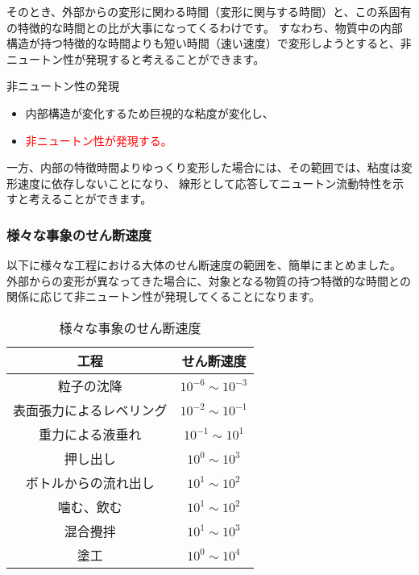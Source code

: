\documentclass[uplatex,dvipdfmx,a4paper,11pt]{jsarticle}
\begin{document}
そのとき、外部からの変形に関わる時間（変形に関与する時間）と、この系固有の特徴的な時間との比が大事になってくるわけです。
すなわち、物質中の内部構造が持つ特徴的な時間よりも短い時間（速い速度）で変形しようとすると、非ニュートン性が発現すると考えることができます。
\begin{itembox}[l]{非ニュートン性の発現}
	\begin{itemize}
		\item 内部構造が変化するため巨視的な粘度が変化し、
		\item \textcolor{red}{非ニュートン性が発現する。}
	\end{itemize}
\end{itembox}

一方、内部の特徴時間よりゆっくり変形した場合には、その範囲では、粘度は変形速度に依存しないことになり、
線形として応答してニュートン流動特性を示すと考えることができます。

\subsubsection{様々な事象のせん断速度}
以下に様々な工程における大体のせん断速度の範囲を、簡単にまとめました。
外部からの変形が異なってきた場合に、対象となる物質の持つ特徴的な時間との関係に応じて非ニュートン性が発現してくることになります。

\begin{table}[htb]
	\caption{様々な事象のせん断速度}
	\begin{center}
		\begin{tabular}{c|c} \hline
			工程 & せん断速度 \\ \hline \hline
			粒子の沈降	& $10^{-6} \sim 10^{-3}$ \\ \hline
			表面張力によるレベリング	& $10^{-2} \sim 10^{-1}$ \\ \hline
			重力による液垂れ	& $10^{-1} \sim 10^{1}$ \\ \hline \hline
			押し出し	& $10^{0} \sim 10^{3}$ \\ \hline
			ボトルからの流れ出し	& $10^{1} \sim 10^{2}$ \\ \hline
			噛む、飲む	& $10^{1} \sim 10^{2}$ \\ \hline
			混合攪拌	& $10^{1} \sim 10^{3}$ \\ \hline
			塗工	& $10^{0} \sim 10^{4}$ \\ \hline
		\end{tabular}
	\end{center}
\end{table}
\end{document}
